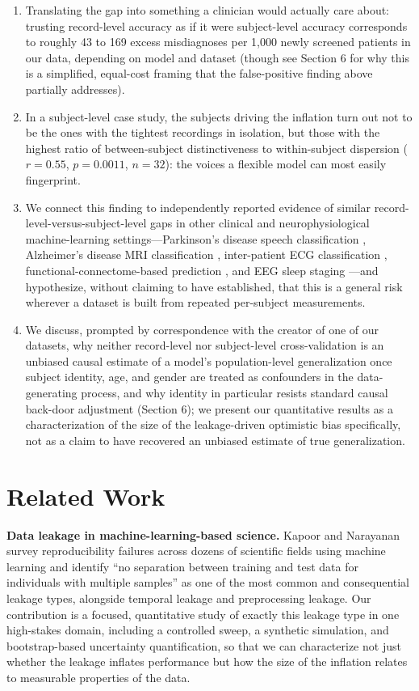 \documentclass[11pt]{article}
\begin{document}
\begin{enumerate}
\item Translating the gap into something a clinician would actually care about: trusting record-level accuracy as if it were subject-level accuracy corresponds to roughly 43 to 169 excess misdiagnoses per 1,000 newly screened patients in our data, depending on model and dataset (though see Section 6 for why this is a simplified, equal-cost framing that the false-positive finding above partially addresses).

\item In a subject-level case study, the subjects driving the inflation turn out not to be the ones with the tightest recordings in isolation, but those with the highest ratio of between-subject distinctiveness to within-subject dispersion ($r=0.55$, $p=0.0011$, $n=32$): the voices a flexible model can most easily fingerprint.

\item We connect this finding to independently reported evidence of similar record-level-versus-subject-level gaps in other clinical and neurophysiological machine-learning settings---Parkinson's disease speech classification \cite{omodunbi2025}, Alzheimer's disease MRI classification \cite{sifat2026}, inter-patient ECG classification \cite{dechazal2004}, functional-connectome-based prediction \cite{rosenblatt2024}, and EEG sleep staging \cite{koksal2026}---and hypothesize, without claiming to have established, that this is a general risk wherever a dataset is built from repeated per-subject measurements.

\item We discuss, prompted by correspondence with the creator of one of our datasets, why neither record-level nor subject-level cross-validation is an unbiased causal estimate of a model's population-level generalization once subject identity, age, and gender are treated as confounders in the data-generating process, and why identity in particular resists standard causal back-door adjustment (Section 6); we present our quantitative results as a characterization of the size of the leakage-driven optimistic bias specifically, not as a claim to have recovered an unbiased estimate of true generalization.
\end{enumerate}

\section{Related Work}
\textbf{Data leakage in machine-learning-based science.} Kapoor and Narayanan \cite{kapoor2023} survey reproducibility failures across dozens of scientific fields using machine learning and identify ``no separation between training and test data for individuals with multiple samples'' as one of the most common and consequential leakage types, alongside temporal leakage and preprocessing leakage. Our contribution is a focused, quantitative study of exactly this leakage type in one high-stakes domain, including a controlled sweep, a synthetic simulation, and bootstrap-based uncertainty quantification, so that we can characterize not just whether the leakage inflates performance but how the size of the inflation relates to measurable properties of the data.
\end{document}
